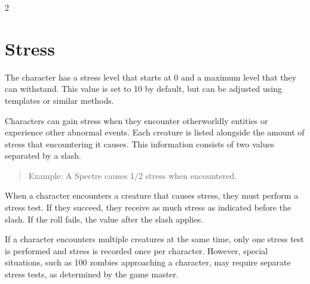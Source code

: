 \label{ch:horror}

\begin{multicols}{2}


\section{Stress}

The character has a stress level that starts at 0 and a maximum level that they can withstand. This value is set to 10 by default, but can be adjusted using templates or similar methods.

Characters can gain stress when they encounter otherworldly entities or experience other abnormal events. Each creature is listed alongside the amount of stress that encountering it causes. This information consists of two values separated by a slash.

\begin{quote}
Example: A Spectre causes 1/2 stress when encountered.
\end{quote}

When a character encounters a creature that causes stress, they must perform a stress test. If they succeed, they receive as much stress as indicated before the slash. If the roll fails, the value after the slash applies.

If a character encounters multiple creatures at the same time, only one stress test is performed and stress is recorded once per character. However, special situations, such as 100 zombies approaching a character, may require separate stress tests, as determined by the game master.


\end{multicols}
